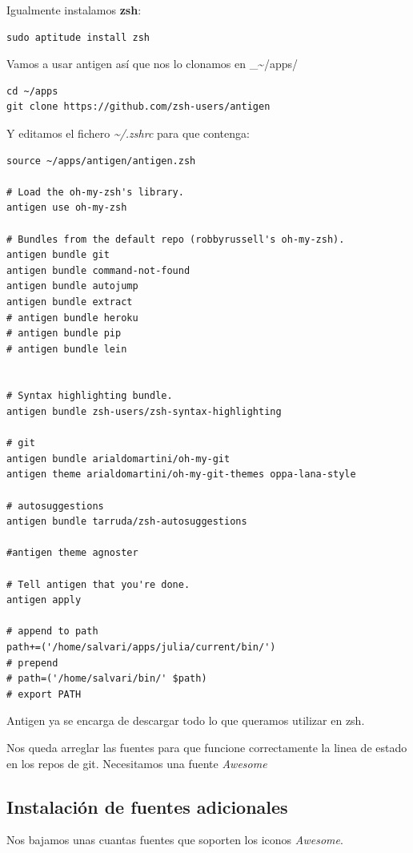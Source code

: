 \documentclass[12pt,spanish,]{article}
\begin{document}
Igualmente instalamos \textbf{zsh}:

\begin{verbatim}
sudo aptitude install zsh
\end{verbatim}

Vamos a usar antigen así que nos lo clonamos en
\_\textasciitilde{}/apps/

\begin{verbatim}
cd ~/apps
git clone https://github.com/zsh-users/antigen
\end{verbatim}

Y editamos el fichero \emph{\textasciitilde{}/.zshrc} para que contenga:

\begin{verbatim}
source ~/apps/antigen/antigen.zsh

# Load the oh-my-zsh's library.
antigen use oh-my-zsh

# Bundles from the default repo (robbyrussell's oh-my-zsh).
antigen bundle git
antigen bundle command-not-found
antigen bundle autojump
antigen bundle extract
# antigen bundle heroku
# antigen bundle pip
# antigen bundle lein


# Syntax highlighting bundle.
antigen bundle zsh-users/zsh-syntax-highlighting

# git
antigen bundle arialdomartini/oh-my-git
antigen theme arialdomartini/oh-my-git-themes oppa-lana-style

# autosuggestions
antigen bundle tarruda/zsh-autosuggestions

#antigen theme agnoster

# Tell antigen that you're done.
antigen apply

# append to path
path+=('/home/salvari/apps/julia/current/bin/')
# prepend
# path=('/home/salvari/bin/' $path)
# export PATH
\end{verbatim}

Antigen ya se encarga de descargar todo lo que queramos utilizar en zsh.

Nos queda arreglar las fuentes para que funcione correctamente la linea
de estado en los repos de git. Necesitamos una fuente \emph{Awesome}

\subsection{Instalación de fuentes
adicionales}\label{instalaciuxf3n-de-fuentes-adicionales}

Nos bajamos unas cuantas fuentes que soporten los iconos \emph{Awesome}.
\end{document}
